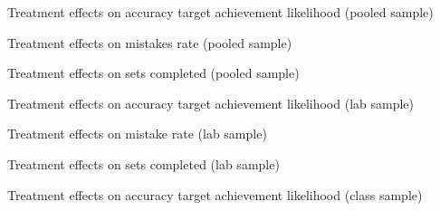 \documentclass[12pt, letterpaper, DIV=11, numbers=noendperiod]{article}
\begin{document}
\begin{table}[p]
\centering
{\scriptsize\renewcommand{\arraystretch}{0.85}
\par}
\caption{Treatment effects on accuracy target achievement likelihood (pooled sample)}\label{tbl-reg-target-full}
\end{table}

\begin{table}[p]
\centering
{\scriptsize\renewcommand{\arraystretch}{0.85}
\par}
\caption{Treatment effects on mistakes rate (pooled sample)}\label{tbl-reg-mistakes-full}
\end{table}

\begin{table}[p]
\centering
{\scriptsize\renewcommand{\arraystretch}{0.85}
\par}
\caption{Treatment effects on sets completed (pooled sample)}\label{tbl-reg-sets-full}
\end{table}

\begin{table}[p]
\centering
{\scriptsize\renewcommand{\arraystretch}{0.85}
\par}
\caption{Treatment effects on accuracy target achievement likelihood (lab sample)}\label{tbl-reg-target-lab}
\end{table}

\begin{table}[p]
\centering
{\scriptsize\renewcommand{\arraystretch}{0.85}
\par}
\caption{Treatment effects on mistake rate (lab sample)}\label{tbl-reg-mistakes-lab}
\end{table}

\begin{table}[p]
\centering
{\scriptsize\renewcommand{\arraystretch}{0.85}
\par}
\caption{Treatment effects on sets completed (lab sample)}\label{tbl-reg-sets-lab}
\end{table}

\begin{table}[p]
\centering
{\scriptsize\renewcommand{\arraystretch}{0.85}
\par}
\caption{Treatment effects on accuracy target achievement likelihood (class sample)}\label{tbl-reg-target-class}
\end{table}
\end{document}
